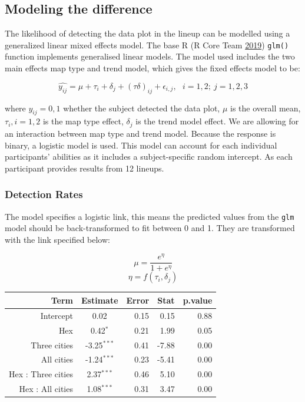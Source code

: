 \documentclass[conference,final,]{IEEEtran}
\begin{document}
\hypertarget{modeling-the-difference}{%
\subsection{Modeling the difference}\label{modeling-the-difference}}

The likelihood of detecting the data plot in the lineup can be modelled
using a generalized linear mixed effects model. The base R (R Core Team
\protect\hyperlink{ref-RCore}{2019}) \texttt{glm()} function implements
generalised linear models. The model used includes the two main effects
map type and trend model, which gives the fixed effects model to be:

\[\widehat{y_{ij}} = \mu + \tau_i + \delta_j + (\tau\delta)_{ij} + \epsilon_{i,j}, ~~~ i=1,2; ~j=1,2,3\]

where \(y_{ij} = 0, 1\) whether the subject detected the data plot,
\(\mu\) is the overall mean, \(\tau_i, i=1,2\) is the map type effect,
\(\delta_j\) is the trend model effect. We are allowing for an
interaction between map type and trend model. Because the response is
binary, a logistic model is used. This model can account for each
individual participants' abilities as it includes a subject-specific
random intercept. As each participant provides results from 12 lineups.

\hypertarget{detection-rates}{%
\subsubsection{Detection Rates}\label{detection-rates}}

The model specifies a logistic link, this means the predicted values
from the \texttt{glm} model should be back-transformed to fit between 0
and 1. They are transformed with the link specified below:

\[\mu = \frac{e^{\eta}}{1 + e^{\eta}}\] \[\eta = f(\tau_i,\delta_j)\]

\begin{tabular}{rcrrr}
\toprule
Term & Estimate & Error & Stat & p.value\\
\midrule
Intercept & 0.02 & 0.15 & 0.15 & 0.88\\
Hex & 0.42$^{*  }$ & 0.21 & 1.99 & 0.05\\
Three cities & -3.25$^{***}$ & 0.41 & -7.88 & 0.00\\
All cities & -1.24$^{***}$ & 0.23 & -5.41 & 0.00\\
Hex : Three cities & 2.37$^{***}$ & 0.46 & 5.10 & 0.00\\
\addlinespace
Hex : All cities & 1.08$^{***}$ & 0.31 & 3.47 & 0.00\\
\bottomrule
\end{tabular}
\end{document}
